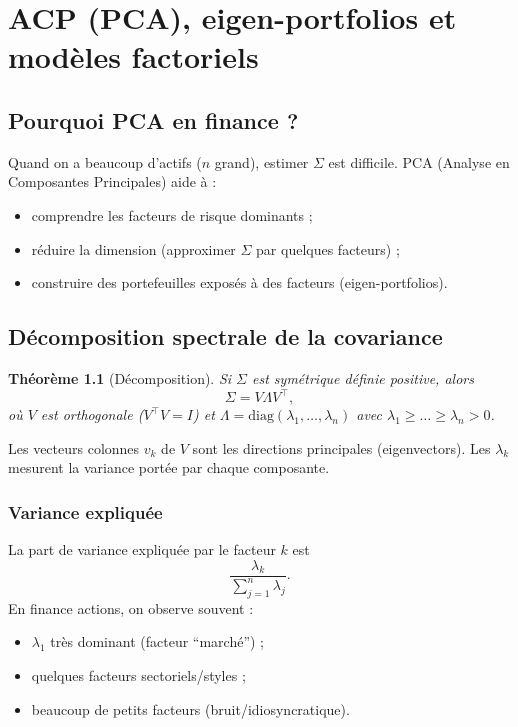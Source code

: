 \documentclass[11pt,a4paper]{report}
\newcommand{\1}{\mathbbm{1}}
\theoremstyle{definition}
\theoremstyle{plain}
\newtheorem{theorem}{Théorème}[chapter]
\theoremstyle{remark}
\begin{document}
\chapter{ACP (PCA), eigen-portfolios et modèles factoriels}
\label{chap:pca}

\section{Pourquoi PCA en finance ?}
Quand on a beaucoup d'actifs ($n$ grand), estimer $\Sigma$ est difficile.
PCA (Analyse en Composantes Principales) aide à :
\begin{itemize}
  \item comprendre les facteurs de risque dominants ;
  \item réduire la dimension (approximer $\Sigma$ par quelques facteurs) ;
  \item construire des portefeuilles exposés à des facteurs (eigen-portfolios).
\end{itemize}

\section{Décomposition spectrale de la covariance}
\begin{theorem}[Décomposition]
Si $\Sigma$ est symétrique définie positive, alors
\[
\Sigma = V\Lambda V^\top,
\]
où $V$ est orthogonale ($V^\top V=I$) et $\Lambda=\mathrm{diag}(\lambda_1,\dots,\lambda_n)$ avec $\lambda_1\ge\dots\ge\lambda_n>0$.
\end{theorem}

Les vecteurs colonnes $v_k$ de $V$ sont les directions principales (eigenvectors).
Les $\lambda_k$ mesurent la variance portée par chaque composante.

\subsection{Variance expliquée}
La part de variance expliquée par le facteur $k$ est
\[
\frac{\lambda_k}{\sum_{j=1}^n \lambda_j}.
\]
En finance actions, on observe souvent :
\begin{itemize}
  \item $\lambda_1$ très dominant (facteur ``marché'') ;
  \item quelques facteurs sectoriels/styles ;
  \item beaucoup de petits facteurs (bruit/idiosyncratique).
\end{itemize}
\end{document}
